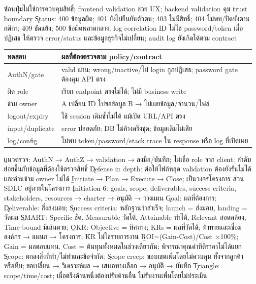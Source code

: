 \r{ซ่อนปุ่มไม่ใช่การควบคุมสิทธิ์}; frontend validation ช่วย UX; backend validation คุม trust boundary
\k{Status}: 400 ข้อมูลผิด; 401 ยังไม่ยืนยันตัวตน; 403 ไม่มีสิทธิ์; 404 ไม่พบ/ปิดบังตามกติกา; 409 ขัดแย้ง; 500 ข้อผิดพลาดกลาง; log correlation ID ไม่ใช่ password/token
\extra เมื่อปฏิเสธ ให้ตรวจ error/status และข้อมูลธุรกิจไม่เปลี่ยน; audit log ยังเกิดได้ตาม contract
{\smalltable\begin{tabularx}{\linewidth}{|p{13mm}|Y|}\hline
{}ทดสอบ & ผลที่ต้องตรวจตาม policy/contract\\\hline
AuthN/gate & valid ผ่าน; wrong/inactive/ไม่ login ถูกปฏิเสธ; password gate ต้องคุม API ตรง\\\hline
ผิด role & เรียก endpoint ตรงไม่ได้; ไม่มี business write\\\hline
ข้าม owner & A เปลี่ยน ID ไปขอข้อมูล B → ไม่เผยข้อมูล/จำนวน/ไฟล์\\\hline
logout/expiry & ใช้ session เดิมซ้ำไม่ได้ แม้เปิด URL/API ตรง\\\hline
input/duplicate & error ปลอดภัย; DB ไม่ค้างครึ่งชุด; ข้อมูลเดิมไม่เสีย\\\hline
log/config & ไม่พบ token/password/stack trace ใน response หรือ log ที่เปิดเผย\\\hline
\end{tabularx}}
\k{แนวตรวจ}: AuthN → AuthZ → validation → ลงมือ/บันทึก; ไม่เชื่อ role จาก client; ลำดับย่อยขึ้นกับข้อมูลที่ต้องใช้ตรวจสิทธิ์
\k{Defense in depth}: ต่อให้ไฟล์หลุด validation ต้องยังรันไม่ได้และอ่านข้าม owner ไม่ได้
\b{Initiate → Plan → Execute → Close}; เป็นวงจรโครงการ ส่วน SDLC อยู่ภายในโครงการ
\k{Initiation 6}: goals, scope, deliverables, success criteria, stakeholders, resources → charter → อนุมัติ → วางแผน
\k{Goal}: ผลที่ต้องการ; \k{Deliverable}: สิ่งส่งมอบ; \k{Success criteria}: หลักฐานว่าสำเร็จ; launch = ส่งมอบ, landing = วัดผล
\k{SMART}: Specific ชัด, Measurable วัดได้, Attainable ทำได้, Relevant สอดคล้อง, Time-bound มีเส้นตาย; 
\k{OKR}: Objective = ทิศทาง; KRs = ผลที่วัดได้; ท้าทายและเชื่อมองค์กร → แผนก → โครงการ; \r{KR ไม่ใช่รายการงาน}
\b{ROI=(Gain-Cost)/Cost ×100\%}; Gain = ผลตอบแทน, Cost = ต้นทุนทั้งหมดในช่วงเดียวกัน; พิจารณาคุณค่าที่ตีราคาไม่ได้แยก
\k{Scope}: ตกลงสิ่งที่ทำ/ไม่ทำและข้อจำกัด; \k{Scope creep}: ขอบเขตเพิ่มโดยไม่ควบคุม ทั้งจากลูกค้าหรือทีม; ขอเปลี่ยน → วิเคราะห์ผล → เสนอทางเลือก → อนุมัติ → บันทึก
\k{Triangle}: scope/time/cost; เมื่อตรึงด้านหนึ่งต้องปรับด้านอื่น ไม่รับงานเพิ่มโดยไม่ประเมิน
